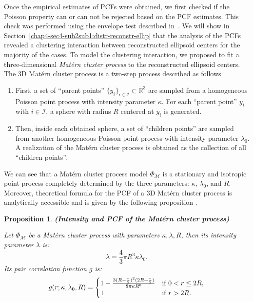 \documentclass[journal]{IEEEtran}
\newcommand{\sidenote}[1]{\textnormal{\textbf{(#1)}}}%
\newtheorem{prop}{Proposition}[section]%
\begin{document}
Once the empirical estimates of PCFs were obtained, we first checked
if the Poisson property can or can not be rejected based on the PCF
estimates. This check was performed using the envelope test described
in~\cite{baddeley2014tests}. We will show in
Section~\ref{chap4-sec4-sub2sub1:distr-reconstr-ellip} that the
analysis of the PCFs revealed a clustering interaction between
reconstructed ellipsoid centers for the majority of the cases. To
model the clustering interaction, we proposed to fit a
three-dimensional \textit{Mat\'ern cluster process}
\cite{baddeley2007spatial} to the reconstructed ellipsoid centers. The
3D Mat\'ern cluster process is a two-step process described as
follows.

\begin{enumerate}

\item First, a set of ``parent points''
  $\{ y_i \}_{i \in \mathcal{I}} \subset \mathbb{R}^3$ are sampled
  from a homogeneous Poisson point process with intensity parameter
  $\kappa$. For each ``parent point'' $y_i$ with $i \in \mathcal{I}$,
  a sphere with radius $R$ centered at $y_i$ is generated.

\item Then, inside each obtained sphere, a set of ``children points''
  are sampled from another homogeneous Poisson point process with
  intensity parameter $\lambda_0$. A realization of the Mat\'ern
  cluster process is obtained as the collection of all ``children
  points''.

\end{enumerate}

We can see that a Mat\'ern cluster process model $\Phi_\mathcal{M}$ is
a stationary and isotropic point process completely determined by the
three parameters: $\kappa$, $\lambda_0$, and $R$. Moreover,
theoretical formula for the PCF of a 3D Mat\'ern cluster process is
analytically accessible and is given by the following proposition
\cite[p376]{illian2008statistical}.

\begin{prop} \sidenote{Intensity and PCF of the Mat\'ern cluster
    process}

  Let $\Phi_{\mathcal{M}}$ be a Mat\'ern cluster process with
  parameters $\kappa, \lambda, R$, then its intensity parameter
  $\lambda$ is:
  \begin{equation}
    \label{eq:matern-inten}
    \lambda = \frac{4}{3}\pi R^3\kappa \lambda_0.
  \end{equation}
  Its pair correlation function $g$ is:
  \begin{equation}
    \label{eq:matern-pcf}
    g(r; \kappa, \lambda_0, R) =
    \begin{cases}
      1 + \frac{3(R - \frac{r}{2})^2
        (2R + \frac{r}{2})} {8\pi \kappa R^6}
      & \textnormal{if } 0 < r \leq 2R, \\
      1 & \textnormal{if } r > 2R. \\
    \end{cases}
  \end{equation}
\end{prop}
\end{document}
